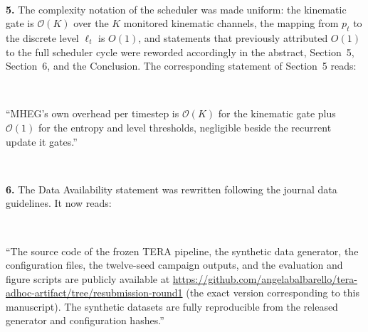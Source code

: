 \documentclass[1p,12pt,authoryear]{elsarticle}
\begin{document}
~

\noindent \textbf{5.} The complexity notation of the scheduler was made uniform: the kinematic gate is $\mathcal{O}(K)$ over the $K$ monitored kinematic channels, the mapping from $p_t$ to the discrete level $\ell_t$ is $O(1)$, and statements that previously attributed $O(1)$ to the full scheduler cycle were reworded accordingly in the abstract, Section~5, Section~6, and the Conclusion. The corresponding statement of Section~5 reads:

~

``MHEG's own overhead per timestep is $\mathcal{O}(K)$ for the kinematic gate plus $\mathcal{O}(1)$ for the entropy and level thresholds, negligible beside the recurrent update it gates.''

~

\noindent \textbf{6.} The Data Availability statement was rewritten following the journal data guidelines. It now reads:

~

``The source code of the frozen TERA pipeline, the synthetic data generator, the configuration files, the twelve-seed campaign outputs, and the evaluation and figure scripts are publicly available at \url{https://github.com/angelabalbarello/tera-adhoc-artifact/tree/resubmission-round1} (the exact version corresponding to this manuscript). The synthetic datasets are fully reproducible from the released generator and configuration hashes.''

~
\end{document}
